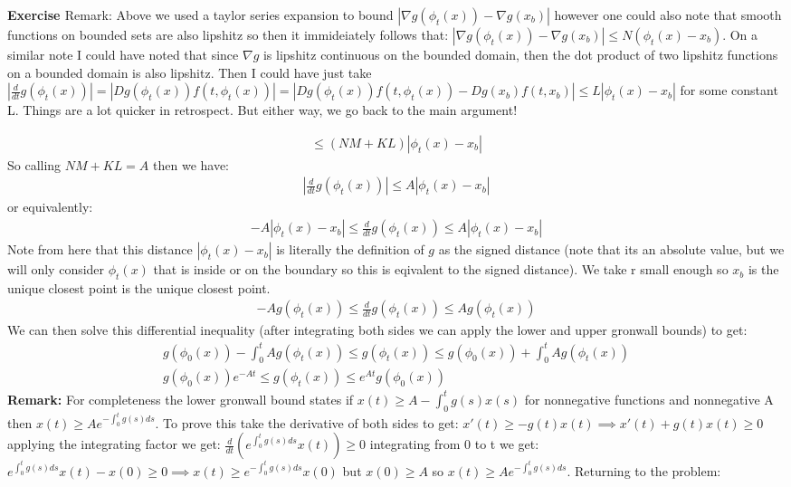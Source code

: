 \documentclass[12pt]{article}
\newenvironment{exercise}[1]{\vspace{.1in}\noindent\textbf{Exercise #1 \hspace{.05em}}}{}
\theoremstyle{definition}
\theoremstyle{remark}
\begin{document}
\begin{exercise}{3.1}
	\textbf{Remark}: Above we used a taylor series expansion to bound $|\nabla g(\phi_t(x))-\nabla g(x_b)|$ however one could also note that smooth functions on bounded sets are also lipshitz so then it immideiately follows that:
	$|\nabla g(\phi_t(x))-\nabla g(x_b)|\leq N(\phi_t(x)-x_b)$. On a similar note I could have noted that since $\nabla g$ is lipshitz continuous on the bounded domain, then the dot product of two lipshitz functions on a bounded domain is also lipshitz. Then I could have just take $|\frac{d}{dt}g(\phi_t(x))|=|Dg(\phi_t(x))f(t,\phi_t(x))|=|Dg(\phi_t(x))f(t,\phi_t(x))-Dg(x_b)f(t,x_b)|\leq L|\phi_t(x)-x_b|$ for some constant L. Things are a lot quicker in retrospect. But either way, we go back to the main argument!

	\begin{align}
		\leq (NM+KL)|\phi_t(x)-x_b|
	\end{align}
	So calling $NM+KL=A$ then we have:
	\begin{align}
		|\frac{d}{dt}g(\phi_t(x))|\leq A|\phi_t(x)-x_b|
	\end{align}
	or equivalently:
	\begin{align}
		-A|\phi_t(x)-x_b|\leq \frac{d}{dt}g(\phi_t(x))\leq A|\phi_t(x)-x_b|
	\end{align}
	Note from here that this distance $|\phi_t(x)-x_b|$ is literally the definition of $g$ as the signed distance (note that its an absolute value, but we will only consider $\phi_t(x)$ that is inside or on the boundary so this is eqivalent to the signed distance). We take r small enough so $x_b$ is the unique closest point is the unique closest point.
	\begin{align}
		-Ag(\phi_t(x))\leq \frac{d}{dt}g(\phi_t(x))\leq Ag(\phi_t(x))
	\end{align}
	We can then solve this differential inequality (after integrating both sides we can apply the lower and upper gronwall bounds) to get:
	\begin{align}
		g(\phi_0(x))-\int_0^tAg(\phi_t(x))\leq g(\phi_t(x))\leq g(\phi_0(x))+\int_0^t Ag(\phi_t(x)) \\
		g(\phi_0(x))e^{-At}\leq g(\phi_t(x)) \leq e^{At}g(\phi_0(x))
	\end{align}
	\textbf{Remark:} For completeness the lower gronwall bound states if $x(t)\geq A-\int_0^tg(s)x(s)$ for nonnegative functions and nonnegative A then $x(t)\geq Ae^{-\int_0^tg(s)ds}$. To prove this take the derivative of both sides to get: $x'(t)\geq -g(t)x(t)\implies x'(t)+g(t)x(t)\geq 0$ applying the integrating factor we get: $\frac{d}{dt}(e^{\int_0^tg(s)ds}x(t))\geq 0$ integrating from 0 to t we get: $e^{\int_0^tg(s)ds}x(t)-x(0)\geq 0\implies x(t)\geq e^{-\int_0^tg(s)ds}x(0)$ but $x(0)\geq A$ so $x(t)\geq Ae^{-\int_0^t g(s)ds}$. Returning to the problem:


\end{exercise}
\end{document}
